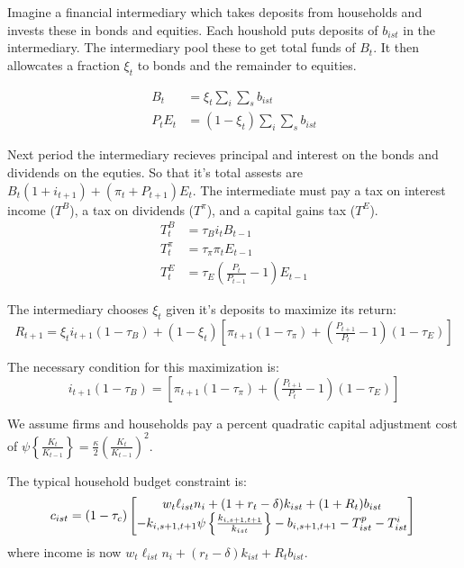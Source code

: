 \documentclass[letterpaper,12pt]{article}
\theoremstyle{definition}
\numberwithin{equation}{section}
\begin{document}
\begin{spacing}{1.5}
    Imagine a financial intermediary which takes deposits from households and invests these in bonds and equities.  Each houshold puts deposits of $b_{ist}$ in the intermediary.  The intermediary pool these to get total funds of $B_t$.  It then allowcates a fraction $\xi_t$ to bonds and the remainder to equities.

    \begin{align} 
    B_t & = \xi_t\sum_i \sum_s b_{ist} \label{Macro_CorpTax_Intermed1}\\
    P_tE_t & = (1-\xi_t)\sum_i \sum_s b_{ist} \label{Macro_CorpTax_Intermed2}
    \end{align}

    Next period the intermediary recieves principal and interest on the bonds and dividends on the equties.  So that it's total assests are $B_t (1+i_{t+1}) + (\pi_t + P_{t+1})E_t$.  The intermediate must pay a tax on interest income ($T^B$), a tax on dividends ($T^\pi$), and a capital gains tax ($T^E$).
    \begin{align}
    T^B_t & = \tau_B i_t B_{t-1} \\
    T^\pi_t & = \tau_\pi \pi_t E_{t-1} \\
    T^E_t & = \tau_E (\tfrac{P_t}{P_{t-1}}-1) E_{t-1}
    \end{align}

    The intermediary chooses $\xi_t$ given it's deposits to maximize its return:
    \begin{equation}
    R_{t+1} = \xi_t i_{t+1} (1-\tau_B) + (1-\xi_t)\left[\pi_{t+1}(1-\tau_\pi)+\left(\tfrac{P_{t+1}}{P_{t}}-1\right)(1-\tau_E)\right]
    \end{equation}

    The necessary condition for this maximization is:
    \begin{equation}
    i_{t+1} (1-\tau_B) = \left[\pi_{t+1}(1-\tau_\pi)+\left(\tfrac{P_{t+1}}{P_{t}}-1\right)(1-\tau_E)\right]
    \end{equation}

    We assume firms and households pay a percent quadratic capital adjustment cost of $\psi\left\{\tfrac{K_t}{K_{t-1}} \right\} = \tfrac{\kappa}{2} \left(\tfrac{K_t}{K_{t-1}}\right)^2$.

    The typical household budget constraint is:
    \begin{equation}
    c_{ist} = (1-\tau_c)\begin{bmatrix} w_t \ell_{ist} n_i + (1+r_t-\delta)k_{ist} + (1+R_t)b_{ist} \\- k_{i,s+1,t+1}\psi\left\{\tfrac{k_{i,s+1,t+1}}{k_{ist}} \right\} - b_{i,s+1,t+1}- T^p_{ist} - T^i_{ist} \end{bmatrix} \\
    \end{equation}
    where income is now $w_t \ell_{ist} n_i + (r_t-\delta)k_{ist} + R_t b_{ist}$.



\end{spacing}
\end{document}
